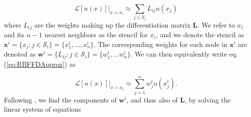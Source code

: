\documentclass[10pt,a4paper]{article}
\begin{document}
\begin{equation}\label{eq:RBFFDApprox}
\mathcal{L}[u(x)]\big|_{x=x_i} \approx \sum_{j \in \mathcal{S}_i} L_{ij} u(x_j)
\end{equation}
where $L_{ij}$ are the weights making up the differentiation matrix $\mathbf{L}$.  We refer to $x_i$ and its $n-1$ nearest neighbors as the stencil for $x_i$, and we denote the stencil as $\mathbf{x}^i = \{x_j : j \in \mathcal{S}_i\} = \{x^i_1,..., x^i_n\}$. The corresponding weights for each node in $\mathbf{x}^i$ are denoted as $\mathbf{w}^i = \{L_{ij} : j \in \mathcal{S}_i\} = \{w^i_1,...w^i_n\}$.  We can then equivalently write eq. (\ref{eq:RBFFDApprox}) as 

\begin{equation}\label{eq:RBFFDApproxAlt}
\mathcal{L}[u(x)]\big|_{x=x_i} \approx \sum_{j=1}^n w^i_j u(x^i_j).
\end{equation}
Following \citet{Fornberg2015}, we find the components of $\mathbf{w}^i$, and thus also of $\mathbf{L}$, by solving the linear system of equations
\end{document}
